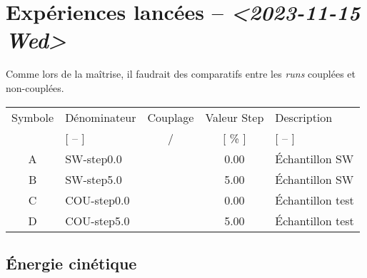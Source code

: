 \documentclass[10pt]{article}
\numberwithin{equation}{section}
\newcommand{\cmark}{\ding{52}}
\newcommand{\xmark}{\ding{55}}
\begin{document}
\section{Expériences lancées -- \textit{<2023-11-15 Wed>}}
\label{sec:org2f1de08}

Comme lors de la maîtrise, il faudrait des comparatifs entre les \emph{runs} couplées et non-couplées.

\begin{center}
\begin{tabular}{clccl}
\hline
\hline
Symbole & Dénominateur & Couplage & Valeur Step & Description\\[0pt]
[ -- ] & [ -- ] & \cmark/\xmark & [ \% ] & [ -- ]\\[0pt]
\hline
A & SW-step0.0 & \xmark & 0.00 & Échantillon SW\\[0pt]
B & SW-step5.0 & \xmark & 5.00 & Échantillon SW\\[0pt]
C & COU-step0.0 & \cmark & 0.00 & Échantillon test\\[0pt]
D & COU-step5.0 & \cmark & 5.00 & Échantillon test\\[0pt]
\hline
\end{tabular}
\end{center}


\subsection{Énergie cinétique}
\label{sec:org897fa2d}



\end{document}

